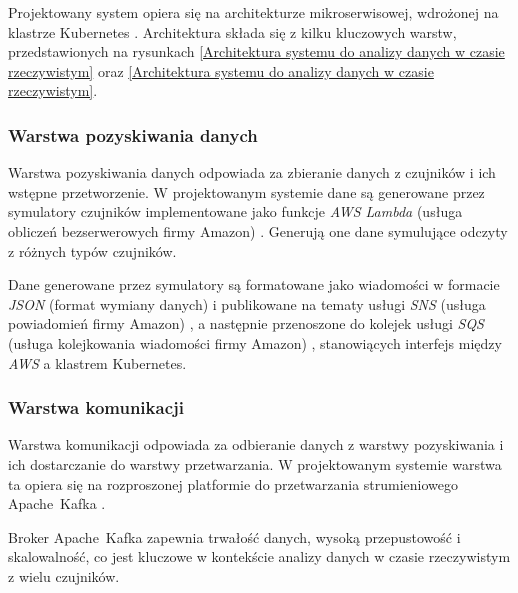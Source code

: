 Projektowany system opiera się na architekturze mikroserwisowej, wdrożonej na klastrze Kubernetes \cite{kubernetes_benefits}.
Architektura składa się z kilku kluczowych warstw, przedstawionych na rysunkach \ref{Architektura systemu do analizy danych w czasie rzeczywistym} oraz \ref{Architektura systemu do analizy danych w czasie rzeczywistym}.



\newpage

\subsubsection{Warstwa pozyskiwania danych}
\label{subsubsec:warstwa_pozyskiwania}

Warstwa pozyskiwania danych odpowiada za zbieranie danych z czujników i ich wstępne przetworzenie.
W projektowanym systemie dane są generowane przez symulatory czujników implementowane jako funkcje \textit{AWS Lambda} (usługa obliczeń bezserwerowych firmy Amazon) \cite{aws_lambda_docs}.
Generują one dane symulujące odczyty z różnych typów czujników.

Dane generowane przez symulatory są formatowane jako wiadomości w formacie \textit{JSON} (format wymiany danych) \cite{json_schema_org} i publikowane na tematy usługi \textit{SNS} (usługa powiadomień firmy Amazon) \cite{sns_docs}, a następnie przenoszone do kolejek usługi \textit{SQS} (usługa kolejkowania wiadomości firmy Amazon) \cite{sqs_docs}, stanowiących interfejs między \textit{AWS} a klastrem Kubernetes.

\subsubsection{Warstwa komunikacji}
\label{subsubsec:warstwa_komunikacji}

Warstwa komunikacji odpowiada za odbieranie danych z warstwy pozyskiwania i ich dostarczanie do warstwy przetwarzania.
W projektowanym systemie warstwa ta opiera się na rozproszonej platformie do przetwarzania strumieniowego \mbox{Apache Kafka} \cite{kafka}.


Broker \mbox{Apache Kafka} zapewnia trwałość danych, wysoką przepustowość i skalowalność, co jest kluczowe w kontekście analizy danych w czasie rzeczywistym z wielu czujników.

